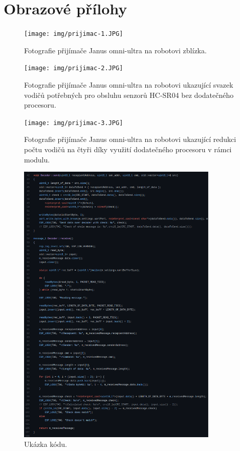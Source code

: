 \chapter{Obrazové přílohy}

\begin{figure}[htbp]
    \centering
    \texttt{[image: img/prijimac-1.JPG]}
    \caption{Fotografie přijímače Janus omni-ultra na robotovi zblízka.}
    \label{fig:prijimac1}
\end{figure}

\begin{figure}[htbp]
    \centering
    \texttt{[image: img/prijimac-2.JPG]}
    \caption{Fotografie přijímače Janus omni-ultra na robotovi ukazující svazek vodičů potřebných pro obsluhu senzorů HC-SR04 bez dodatečného procesoru.}
    \label{fig:prijimac2}
\end{figure}

\begin{figure}[htbp]
    \centering
    \texttt{[image: img/prijimac-3.JPG]}
    \caption{Fotografie přijímače Janus omni-ultra na robotovi ukazující redukci počtu vodičů na čtyři díky využití dodatečného procesoru v rámci modulu.}
    \label{fig:prijimac3}
\end{figure}

\begin{figure}[htbp]
    \centering
    \includegraphics[width=0.85\textwidth]{img/ukazka-kod.png}
    \caption{Ukázka kódu.}
    \label{fig:kod}
\end{figure}

